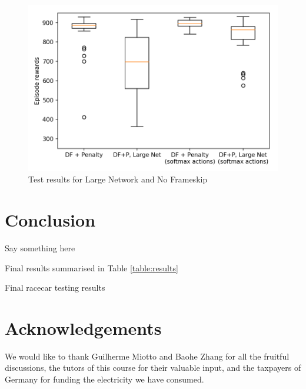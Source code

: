 \documentclass[a4paper, 11pt, conference]{ieeeconf}      %
\begin{document}
\begin{figure}[h!]
  \includegraphics[width=\linewidth]{figs/racecar_4.png}
  \caption{Test results for Large Network and No Frameskip}
  \label{fig:test4}
\end{figure}

\section*{Conclusion}

Say something here

Final results summarised in Table \ref{table:results}

\begin{table}
  \centering
  \caption{Final racecar testing results}
  \label{table:results}
  
  \end{table}

\section*{Acknowledgements}

We would like to thank Guilherme Miotto and Baohe Zhang for all the fruitful discussions, the tutors of this course for their valuable input, and the taxpayers of Germany for funding the electricity we have consumed.

\end{document}
